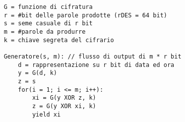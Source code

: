 \begin{verbatim}
    G = funzione di cifratura
    r = #bit delle parole prodotte (rDES = 64 bit)
    s = seme casuale di r bit
    m = #parole da produrre
    k = chiave segreta del cifrario

    Generatore(s, m): // flusso di output di m * r bit
        d = rappresentazione su r bit di data ed ora
        y = G(d, k)
        z = s
        for(i = 1; i <= m; i++):
            xi = G(y XOR z, k)
            z = G(y XOR xi, k)
            yield xi
\end{verbatim}